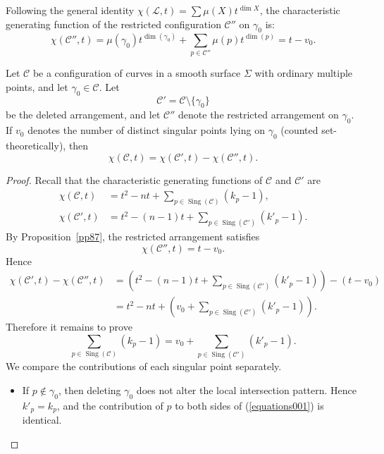 \documentclass[article,11pt]{amsart} \numberwithin{equation}{section}
\numberwithin{equation}{section}
\begin{document}
{\begin{df}
	Following the general identity $\chi(\mathcal{L}, t) = \sum \mu(X)t^{\dim X}$, the characteristic generating function of the restricted configuration $\mathcal{C}''$ on $\gamma_0$ is:
	\[
	\chi(\mathcal{C}'', t) = \mu(\gamma_0)t^{\dim(\gamma_0)} + \sum_{p \in \mathcal{C}''} \mu(p)t^{\dim(p)} = t - v_0.
	\]
\end{df}

\begin{thm}
	\label{thm:deletion_restriction_curves}
	Let $\mathcal{C}$ be a configuration of curves in a smooth surface $\Sigma$
	with ordinary multiple points, and let $\gamma_0\in\mathcal C$.
	Let
	\[
	\mathcal C'=\mathcal C\setminus\{\gamma_0\}
	\]
	be the deleted arrangement, and let $\mathcal C''$
	denote the restricted arrangement on $\gamma_0$.
	If $v_0$ denotes the number of distinct singular points lying on
	$\gamma_0$ (counted set-theoretically), then
	\[
	\chi(\mathcal C,t) = \chi(\mathcal C',t)-\chi(\mathcal C'',t).
	\]
\end{thm}

\begin{proof}
	Recall that the characteristic generating functions of
	$\mathcal C$ and $\mathcal C'$ are
	\begin{align*}
		\chi(\mathcal C,t)
		&= t^2-nt + \sum_{p\in\operatorname{Sing}(\mathcal C)} (k_p-1),\\
		\chi(\mathcal C',t)
		&= t^2-(n-1)t + \sum_{p\in\operatorname{Sing}(\mathcal C')} (k'_p-1).
	\end{align*}
	By Proposition~\ref{pp87}, the restricted arrangement satisfies
	\[
	\chi(\mathcal C'',t)=t-v_0.
	\]
	Hence
	\begin{align*}
		\chi(\mathcal C',t)-\chi(\mathcal C'',t)
		&= \left( t^2-(n-1)t + \sum_{p\in\operatorname{Sing}(\mathcal C')} (k'_p-1) \right) - (t-v_0) \\
		&= t^2-nt + \left( v_0 + \sum_{p\in\operatorname{Sing}(\mathcal C')} (k'_p-1) \right).
	\end{align*}
	Therefore it remains to prove
	\begin{equation}\label{equations001}
	\sum_{p\in\operatorname{Sing}(\mathcal C)} (k_p-1)
	=
	v_0 + \sum_{p\in\operatorname{Sing}(\mathcal C')} (k'_p-1). 
	\end{equation}
	We compare the contributions of each singular point separately.
	
	\begin{itemize}
		\item If $p\notin\gamma_0$, then deleting $\gamma_0$ does not alter the local intersection pattern. Hence $k'_p=k_p$, and the contribution of $p$ to both sides of (\ref{equations001}) is identical.
		

\end{itemize}
\end{proof}}
\end{document}
